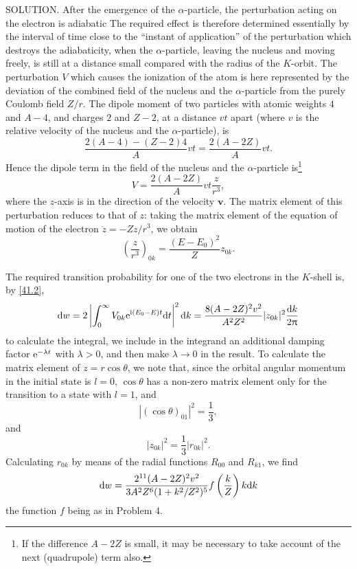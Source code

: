 {SOLUTION. After the emergence of the $\alpha$-particle, the perturbation acting on the electron is adiabatic The required effect is therefore determined essentially by the interval of time close to the “instant of application” of the perturbation which destroys the adiabaticity, when the $\alpha$-particle, leaving the nucleus and moving freely, is still at a distance small compared with the radius of the $ K $-orbit. The perturbation $ V $ which causes the ionization of the atom is here represented by the deviation of the combined field of the nucleus and the $\alpha$-particle from the purely Coulomb field $ Z/r $. The dipole moment of two particles with atomic weights $ 4 $ and $ A-4 $, and charges $ 2 $ and $ Z-2 $, at a distance $ vt $ apart (where $ v $ is the relative velocity of the nucleus and the $\alpha$-particle), is
\[ \frac{2(A-4)-(Z-2)4}{A}vt=\frac{2(A-2Z)}{A}vt. \]
Hence the dipole term in the field of the nucleus and the $\alpha$-particle is\footnote{If the difference $ A-2Z $ is small, it may be necessary to take account of the next (quadrupole) term also.
}
\[ V=\frac{2(A-2Z)}{A}vt\frac{z}{r^3}, \]
where the $ z $-axis is in the direction of the velocity $ \bm{v} $. The matrix element of this perturbation reduces to that of $ z $: taking the matrix element of the equation of motion of the electron $ \ddot{z}=-Zz/r^3 $, we obtain
\[ \left(\frac{z}{r^3} \right)_{0k}=\frac{(E-E_0)^2}{Z}z_{0k}. \]



The required transition probability for one of the two electrons in the $ K $-shell is, by \eqref{41.2},
\[ \mathrm{d} w=2\left|\int_{0}^{\infty}V_{0k}\mathrm{e}^{\mathrm{i}(E_0-E)t}\mathrm{d} t \right|^2\mathrm{d} k=\frac{8(A-2Z)^2v^2}{A^2Z^2}|z_{0k}|^2\frac{\mathrm{d} k}{2\uppi} \]
to calculate the integral, we include in the integrand an additional damping factor $ \mathrm{e}^{-\lambda t} $ with $ \lambda > 0 $, and then make $ \lambda\to  0 $ in the result. To calculate the matrix element of $ z = r \cos \theta $, we note that, since the orbital angular momentum in the initial state is $ l = 0 $, $ \cos \theta $ has a non-zero matrix element only for the transition to a state with $ l = 1 $, and
\[ |(\cos\theta)_{01}|^2=\frac{1}{3}, \]
and
\[ |z_{0k}|^2=\frac{1}{3}|r_{0k}|^2. \]
Calculating $ r_{0k} $ by means of the radial functions $ R_{00} $ and $ R_{k1} $, we find
\[ \mathrm{d} w=\frac{2^{11}(A-2Z)^2v^2}{3A^2Z^6(1+k^2/Z^2)^5}f\left(\frac{k}{Z} \right)k\mathrm{d} k\]
the function $ f $ being as in Problem 4.
}
